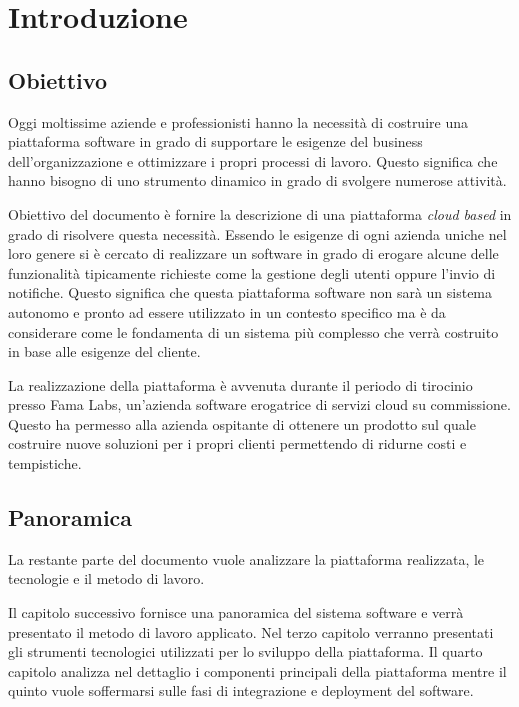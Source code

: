 \chapter{Introduzione}
\section{Obiettivo}
Oggi moltissime aziende e professionisti hanno la necessità di costruire
una piattaforma software in grado di supportare le esigenze del business dell'organizzazione e
ottimizzare i propri processi di lavoro. Questo significa che hanno bisogno di uno strumento dinamico
in grado di svolgere numerose attività.

Obiettivo del documento è fornire la descrizione di una piattaforma \textit{cloud based} in grado di risolvere questa necessità.
Essendo le esigenze di ogni azienda uniche nel loro genere si è cercato di realizzare un software in grado
di erogare alcune delle funzionalità tipicamente richieste come la gestione degli utenti oppure l'invio di notifiche.
Questo significa che questa piattaforma software non sarà un sistema autonomo e pronto ad essere utilizzato in un contesto specifico ma
è da considerare come le fondamenta di un sistema più complesso che verrà costruito in base alle esigenze del cliente.

La realizzazione della piattaforma è avvenuta durante il periodo di tirocinio presso Fama Labs,
un'azienda software erogatrice di servizi cloud su commissione.
Questo ha permesso alla azienda ospitante di ottenere un prodotto sul quale costruire nuove soluzioni per i propri clienti
permettendo di ridurne costi e tempistiche.

\section{Panoramica}
La restante parte del documento vuole analizzare la piattaforma realizzata, le tecnologie e il metodo di lavoro.

Il capitolo successivo fornisce una panoramica del sistema software
e verrà presentato il metodo di lavoro applicato. Nel terzo capitolo verranno presentati
gli strumenti tecnologici utilizzati per lo sviluppo della piattaforma. Il quarto capitolo
analizza nel dettaglio i componenti principali della piattaforma mentre il quinto
vuole soffermarsi sulle fasi di integrazione e deployment del software.
